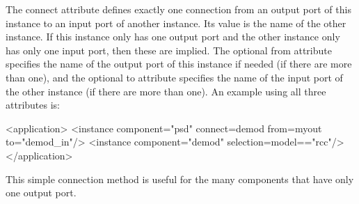 \documentclass[10pt, a4paper, oneside]{article}
\renewcommand\_{\textunderscore\allowbreak} %
\begin{document}
The connect attribute defines exactly one connection from an output port of this instance to an input port of another instance. Its value is the name of the other instance. If this instance only has one output port and the other instance only has only one input port, then these are implied. The optional from attribute specifies the name of the output port of this instance if needed (if there are more than one), and the optional to attribute specifies the name of the input port of the other instance (if there are more than one). An example using all three attributes is:\begin{ocpixml}
<application>
    <instance component="psd"
    		connect=demod from=myout to="demod_in"/>
   <instance component="demod" selection=model=="rcc"/>
  </application>\end{ocpixml}
This simple connection method is useful for the many components that have only one output port.
\end{document}
